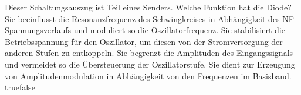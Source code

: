     {Dieser Schaltungsauszug ist Teil eines Senders. Welche Funktion hat die Diode?}
    {Sie beeinflusst die Resonanzfrequenz des Schwingkreises in Abhängigkeit des NF-Spannungsverlaufs und moduliert so die Oszillatorfrequenz.}
    {Sie stabilisiert die Betriebsspannung für den Oszillator, um diesen von der Stromversorgung der anderen Stufen zu entkoppeln.}
    {Sie begrenzt die Amplituden des Eingangssignals und vermeidet so die Übersteuerung der Oszillatorstufe.}
    {Sie dient zur Erzeugung von Amplitudenmodulation in Abhängigkeit von den Frequenzen im Basisband.}
    {true}{false}